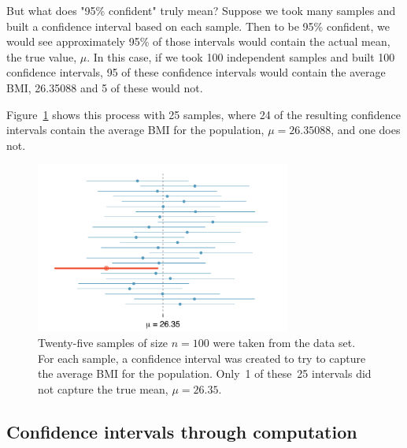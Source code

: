 But what does "95\% confident" truly mean? Suppose we took many samples and built a confidence interval based on each sample. Then to be 95\% confident, we would see approximately 95\% of those intervals would contain the actual mean, the true value, $\mu$. In this case, if we took 100 independent samples and built 100 confidence intervals, 95 of these confidence intervals would contain the average BMI, 26.35088 and 5 of these would not.

Figure~\ref{95PercentConfidenceInterval} shows this process with 25 samples, where 24 of the resulting confidence intervals contain the average BMI for the population, $\mu=26.35088$, and one does not.

\begin{figure}[hht]
   \centering
   \includegraphics[width=0.75\textwidth]{ch_inference_foundations_oi_biostat/figures/95PercentConfidenceInterval/95PercentConfidenceIntervalbrfss}
   \caption{Twenty-five samples of size $n=100$ were taken from the  data set. For each sample, a confidence interval was created to try to capture the average BMI for the population. Only~1 of these~25 intervals did not capture the true mean, $\mu = 26.35$. }
   \label{95PercentConfidenceInterval}
\end{figure}

\subsection{Confidence intervals through computation}

